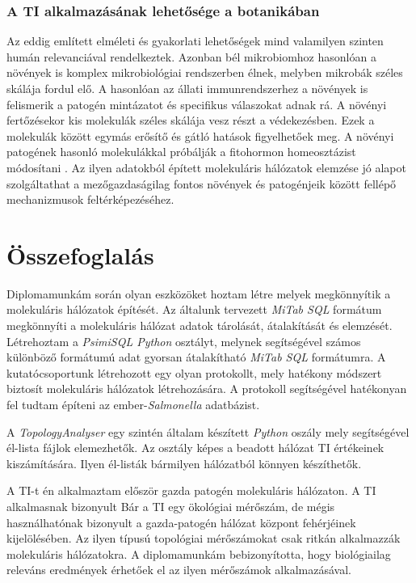 \documentclass[a4paper,12pt]{article}
\begin{document}
		\subsubsection{A TI alkalmazásának lehetősége a botanikában}
		Az eddig említett elméleti és gyakorlati lehetőségek mind valamilyen szinten humán relevanciával rendelkeztek. Azonban bél mikrobiomhoz hasonlóan a növények is komplex mikrobiológiai rendszerben élnek, melyben mikrobák széles skálája fordul elő. 
		A hasonlóan az állati immunrendszerhez a növények is felismerik a patogén mintázatot és specifikus válaszokat adnak rá. A növényi fertőzésekor kis molekulák széles skálája vesz részt a védekezésben. Ezek a molekulák között egymás erősítő és gátló hatások figyelhetőek meg. A növényi patogének hasonló molekulákkal próbálják a fitohormon homeosztázist módosítani \cite{discussion_plant_network} . Az ilyen adatokból épített molekuláris hálózatok elemzése jó alapot szolgáltathat a mezőgazdaságilag fontos növények és patogénjeik között fellépő mechanizmusok feltérképezéséhez.
		
		\pagebreak

\section{Összefoglalás}
		
		Diplomamunkám során olyan eszközöket hoztam létre melyek megkönnyítik a molekuláris hálózatok építését.  Az általunk tervezett \textit{MiTab SQL} formátum megkönnyíti a molekuláris hálózat adatok tárolását, átalakítását és elemzését. Létrehoztam a  \textit{PsimiSQL Python} osztályt, melynek segítségével számos különböző formátumú adat gyorsan átalakítható \textit{MiTab SQL} formátumra. A kutatócsoportunk létrehozott egy olyan protokollt, mely hatékony módszert biztosít molekuláris hálózatok létrehozására. A protokoll segítségével hatékonyan fel tudtam építeni az ember-\textit{Salmonella} adatbázist.
		
		\vspace{22pt}
		
		A \textit{TopologyAnalyser} egy szintén általam készített \textit{Python} oszály mely segítségével él-lista fájlok elemezhetők. Az osztály képes a beadott hálózat TI értékeinek kiszámítására. Ilyen él-listák bármilyen hálózatból könnyen készíthetők. 
		
		\vspace{22pt}
		
		A TI-t én alkalmaztam először gazda patogén molekuláris hálózaton. A TI alkalmasnak bizonyult Bár a TI egy ökológiai mérőszám, de mégis használhatónak bizonyult a gazda-patogén hálózat központ fehérjéinek kijelölésében. Az ilyen típusú topológiai mérőszámokat csak ritkán alkalmazzák molekuláris hálózatokra. A diplomamunkám bebizonyította, hogy biológiailag releváns eredmények érhetőek el az ilyen mérőszámok alkalmazásával.
\end{document}
